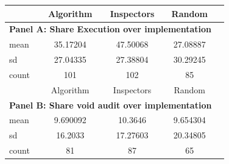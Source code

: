 \begin{tabular}{l*{4}{c}} \hline
            &   Algorithm&  Inspectors&      Random\\
\hline \multicolumn{4}{l}{\textbf{Panel A: Share Execution  over implementation}} \\
mean        &    35.17204&    47.50068&    27.08887\\
sd          &    27.04335&    27.38804&    30.29245\\
count       &         101&         102&          85\\
\hline
            &   Algorithm&  Inspectors&      Random\\
\hline \multicolumn{4}{l}{\textbf{Panel B: Share void audit over implementation}} \\
mean        &    9.690092&     10.3646&    9.654304\\
sd          &     16.2033&    17.27603&    20.34805\\
count       &          81&          87&          65\\
\hline \end{tabular}
